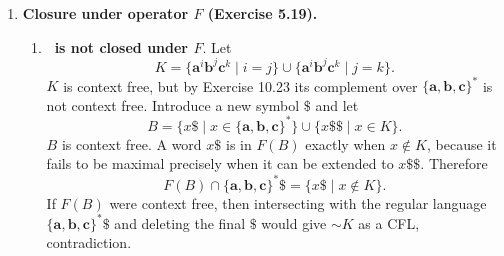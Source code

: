 \begin{enumerate}[{10.}1. ]
\begin{enumerate}
\item \textbf{\ASIG\ is closed under $P$}: Let $P$ be a DPDA that has been
prepared so that every computation reads the entire input, never empties the
bottom stack marker, and halts only after the last input symbol has been
processed. For each stack symbol $X$, use two tagged copies
$X^{\mathrm{live}}$ and $X^{\mathrm{dead}}$. While simulating $P$, the new
machine maintains on the stack not just the current stack symbols but also, for
each stack position, whether the subconfiguration beginning at that position can
still be extended to an accepting computation. Because the original machine is
deterministic, this tag is forced by the current state and the tagged symbols
that replace $X$ in the next move. The machine therefore updates the tags
deterministically whenever it pushes or pops. After the input ends, the
simulated configuration is live exactly when the topmost tag is
$\mathrm{live}$, and that is exactly the condition $x\in P(L)$. Hence a DPDA
can accept the prefix language.
\end{enumerate}

\item \textbf{Closure under operator $F$ (Exercise 5.19).}

\begin{enumerate}
\item \textbf{\PSIG\ is not closed under $F$}. Let
\[
K=\{\pmb{a}^i\pmb{b}^j\pmb{c}^k\mid i=j\}\cup\{\pmb{a}^i\pmb{b}^j\pmb{c}^k\mid j=k\}.
\]
$K$ is context free, but by Exercise 10.23 its complement over $\{\pmb{a},\pmb{b},\pmb{c}\}^*$ is not context free. Introduce a new symbol $\pmb{\$}$ and let
\[
B=\{x\pmb{\$}\mid x\in\{\pmb{a},\pmb{b},\pmb{c}\}^*\}\cup\{x\pmb{\$\$}\mid x\in K\}.
\]
$B$ is context free. A word $x\pmb{\$}$ is in $F(B)$ exactly when $x\notin K$, because it fails to be maximal precisely when it can be extended to $x\pmb{\$\$}$. Therefore
\[
F(B)\cap\{\pmb{a},\pmb{b},\pmb{c}\}^*\pmb{\$}
=\{x\pmb{\$}\mid x\notin K\}.
\]
If $F(B)$ were context free, then intersecting with the regular language $\{\pmb{a},\pmb{b},\pmb{c}\}^*\pmb{\$}$ and deleting the final $\pmb{\$}$ would give $\sim K$ as a CFL, contradiction.


\end{enumerate}
\end{enumerate}
